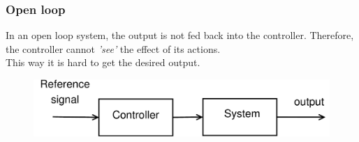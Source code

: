 \documentclass{beamer}
\begin{document}
\begin{frame}
\frametitle{Open loop}
\vspace{-10ex}
In an open loop system, the output is not fed back into the controller. Therefore, the controller cannot \textit{'see'} the effect of its actions. \\
This way it is hard to get the desired output.\\
\bigskip
\bigskip
\begin{figure}
\includegraphics[width=1\linewidth]{open_loop}
\end{figure}
\end{frame}

\end{document}
